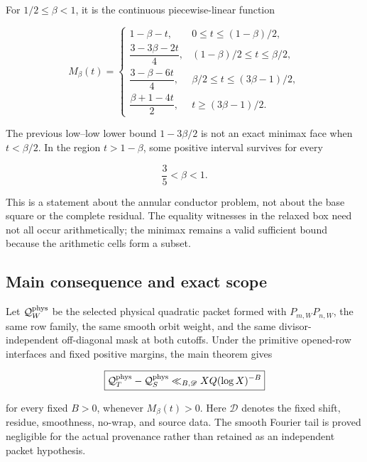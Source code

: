 For \(1/2\le\beta<1\), it is the continuous piecewise-linear
function

\begin{equation}
 M_\beta(t)=
 \begin{cases}
 1-\beta-t,
 &0\le t\le(1-\beta)/2,\\[2pt]
 \dfrac{3-3\beta-2t}{4},
 &(1-\beta)/2\le t\le\beta/2,\\[5pt]
 \dfrac{3-\beta-6t}{4},
 &\beta/2\le t\le(3\beta-1)/2,\\[5pt]
 \dfrac{\beta+1-4t}{2},
 &t\ge(3\beta-1)/2.
 \end{cases}
 \label{eq:tpc26-intro-sharp-ledger}
\end{equation}

The previous low--low lower bound \(1-3\beta/2\) is not an exact
minimax face when \(t<\beta/2\).  In the region \(t>1-\beta\), some
positive interval survives for every

\begin{equation}
 \frac35<\beta<1.
 \label{eq:tpc26-intro-beta-range}
\end{equation}

This is a statement about the annular conductor problem, not about the
base square or the complete residual.  The equality witnesses in the
relaxed box need not all occur arithmetically; the minimax remains a
valid sufficient bound because the arithmetic cells form a subset.

\subsection{Main consequence and exact scope}

Let \(\mathcal Q_W^{\rm phys}\) be the selected physical quadratic
packet formed with \(P_{m,W}P_{n,W}\), the same row family, the same
smooth orbit weight, and the same divisor-independent off-diagonal mask
at both cutoffs.  Under the primitive opened-row interfaces and fixed
positive margins, the main theorem gives

\begin{equation}
 \boxed{
 \mathcal Q_T^{\rm phys}-\mathcal Q_S^{\rm phys}
 \ll_{B,\mathscr D}XQ(\log X)^{-B}}
 \label{eq:tpc26-intro-main}
\end{equation}

for every fixed \(B>0\), whenever \(M_\beta(t)>0\).  Here
\(\mathscr D\) denotes the fixed shift, residue, smoothness, no-wrap,
and source data.  The smooth Fourier tail is proved negligible for the
actual provenance rather than retained as an independent packet
hypothesis.


